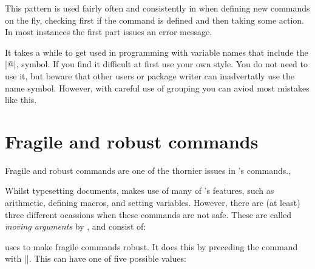 This pattern is used fairly often and consistently in \latex when defining new commands on the fly, checking first if the command is defined and then taking some action. In most instances the first part issues an error message.

\makeatletter
\p@=1pt
\the\p@

\makeatother

It takes a while to get used in programming with variable names that include the |@|, symbol. If you find it difficult at first use your own style. You do not need to use it, but beware that other users or package writer can inadvertatly use the name symbol. However, with careful use of grouping you can aviod most mistakes like this.


\section{Fragile and robust commands}

Fragile and robust commands are one of the thornier issues in \latex's commands.,

Whilst typesetting documents, \latex makes use of many of \tex's features, such as
arithmetic, defining macros, and setting variables. However, there are (at least) three different ocassions when these commands are not safe. These are called \emph{moving arguments} by \latex, and consist of:


\latex uses  to make fragile commands robust. It does this by preceding the command with |\protect|. This can have one of five possible values:

